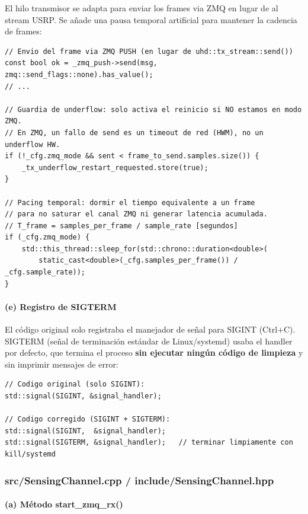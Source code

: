 \documentclass[11pt,a4paper]{article}
\begin{document}
El hilo transmisor se adapta para enviar los frames via ZMQ en lugar de al stream USRP.
Se añade una pausa temporal artificial para mantener la cadencia de frames:

\begin{lstlisting}[style=cpp,
  caption={Envío ZMQ y pacing temporal — OFDMModulator.cpp}]
// Envio del frame via ZMQ PUSH (en lugar de uhd::tx_stream::send())
const bool ok = _zmq_push->send(msg, zmq::send_flags::none).has_value();
// ...

// Guardia de underflow: solo activa el reinicio si NO estamos en modo ZMQ.
// En ZMQ, un fallo de send es un timeout de red (HWM), no un underflow HW.
if (!_cfg.zmq_mode && sent < frame_to_send.samples.size()) {
    _tx_underflow_restart_requested.store(true);
}

// Pacing temporal: dormir el tiempo equivalente a un frame
// para no saturar el canal ZMQ ni generar latencia acumulada.
// T_frame = samples_per_frame / sample_rate [segundos]
if (_cfg.zmq_mode) {
    std::this_thread::sleep_for(std::chrono::duration<double>(
        static_cast<double>(_cfg.samples_per_frame()) / _cfg.sample_rate));
}
\end{lstlisting}

\paragraph{(e) Registro de SIGTERM}

El código original solo registraba el manejador de señal para SIGINT (Ctrl+C).
SIGTERM (señal de terminación estándar de Linux/systemd) usaba el handler por
defecto, que termina el proceso \textbf{sin ejecutar ningún código de limpieza} y
sin imprimir mensajes de error:

\begin{lstlisting}[style=cpp,
  caption={Registro de SIGTERM — OFDMModulator.cpp}]
// Codigo original (solo SIGINT):
std::signal(SIGINT, &signal_handler);

// Codigo corregido (SIGINT + SIGTERM):
std::signal(SIGINT,  &signal_handler);
std::signal(SIGTERM, &signal_handler);   // terminar limpiamente con kill/systemd
\end{lstlisting}

\subsubsection{src/SensingChannel.cpp / include/SensingChannel.hpp}

\paragraph{(a) Método start\_zmq\_rx()}
\end{document}
